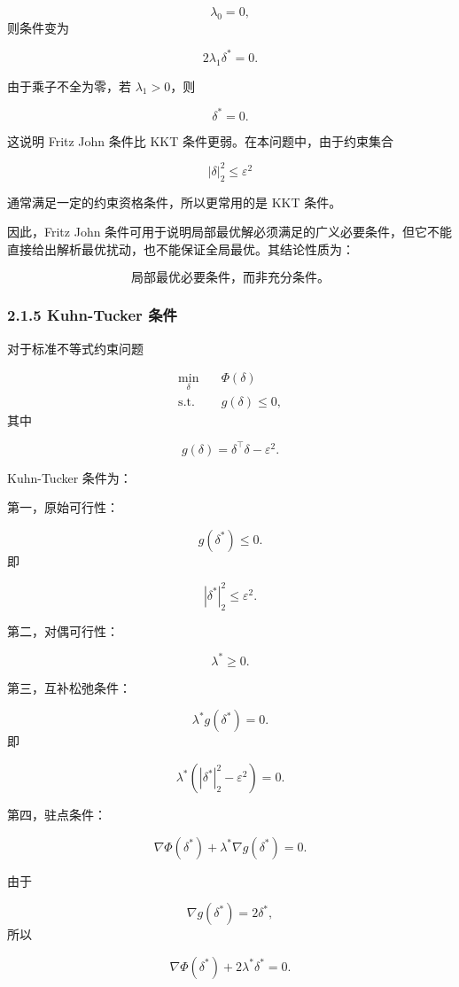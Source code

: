 ﻿\documentclass[UTF8,zihao=-4,fontset=none]{ctexart}
\begin{document}
\[
\lambda_0=0,
\]
\noindent 则条件变为

\[
2\lambda_1\delta^*=0.
\]

由于乘子不全为零，若 \(\lambda_1>0\)，则

\[
\delta^*=0.
\]

这说明 Fritz John 条件比 KKT 条件更弱。在本问题中，由于约束集合

\[
|\delta|_2^2\le \varepsilon^2
\]

通常满足一定的约束资格条件，所以更常用的是 KKT 条件。

因此，Fritz John 条件可用于说明局部最优解必须满足的广义必要条件，但它不能直接给出解析最优扰动，也不能保证全局最优。其结论性质为：

\[
\text{局部最优必要条件，而非充分条件。}
\]

\subsubsection*{2.1.5 Kuhn-Tucker 条件}
{}

对于标准不等式约束问题

\[
\begin{aligned}
\min_{\delta}
\quad & \Phi(\delta)\\
\mathrm{s.t.}
\quad & g(\delta)\le 0,
\end{aligned}
\]
\noindent 其中

\[
g(\delta)=\delta^\top\delta-\varepsilon^2.
\]

Kuhn-Tucker 条件为：

第一，原始可行性：

\[
g(\delta^*)\le 0.
\]
\noindent 即

\[
|\delta^*|_2^2\le \varepsilon^2.
\]

第二，对偶可行性：

\[
\lambda^*\ge 0.
\]

第三，互补松弛条件：

\[
\lambda^*g(\delta^*)=0.
\]
\noindent 即

\[
\lambda^*(|\delta^*|_2^2-\varepsilon^2)=0.
\]

第四，驻点条件：

\[
\nabla\Phi(\delta^*)+\lambda^*\nabla g(\delta^*)=0.
\]

由于

\[
\nabla g(\delta^*)=2\delta^*,
\]
\noindent 所以

\[
\nabla\Phi(\delta^*)+2\lambda^*\delta^*=0.
\]
\end{document}
